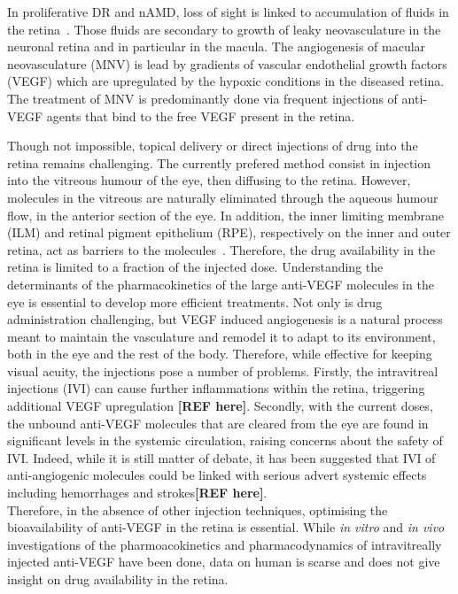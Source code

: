 \documentclass[12pt,a4paper]{article}
\begin{document}
In proliferative DR and nAMD, loss of sight is linked to accumulation of fluids in the retina~\cite{Waldstein_2016, Roberts_2020}.
Those fluids are secondary to growth of leaky neovasculature in the neuronal retina and in particular in the macula.
The angiogenesis of macular neovasculature (MNV) is lead by gradients of vascular endothelial growth factors (VEGF) which are upregulated by the hypoxic conditions in the diseased retina.
The treatment of MNV is predominantly done via frequent injections of anti-VEGF agents that bind to the free VEGF present in the retina.

Though not impossible, topical delivery or direct injections of drug into the retina remains challenging.
The currently prefered method consist in injection into the vitreous humour of the eye, then diffusing to the retina.
However, molecules in the vitreous are naturally eliminated through the aqueous humour flow, in the anterior section of the eye.
In addition, the inner limiting membrane (ILM) and retinal pigment epithelium (RPE), respectively on the inner and outer retina, act as barriers to the molecules~\cite{park_intraocular_2015}.
Therefore, the drug availability in the retina is limited to a fraction of the injected dose.
Understanding the determinants of the pharmacokinetics of the large anti-VEGF molecules in the eye is essential to develop more efficient treatments.
Not only is drug administration challenging, but VEGF induced angiogenesis is a natural process meant to maintain the vasculature and remodel it to adapt to its environment, both in the eye and the rest of the body.
Therefore, while effective for keeping visual acuity, the injections pose a number of problems.
Firstly, the intravitreal injections (IVI) can cause further inflammations within the retina, triggering additional VEGF upregulation \textbf{[REF here]}.
Secondly, with the current doses, the unbound anti-VEGF molecules that are cleared from the eye are found in significant levels in the systemic circulation, raising concerns about the safety of IVI.
Indeed, while it is still matter of debate, it has been suggested that IVI of anti-angiogenic molecules could be linked with serious advert systemic effects including hemorrhages and strokes\textbf{[REF here]}. \\
Therefore, in the absence of other injection techniques, optimising the bioavailability of anti-VEGF in the retina is essential.
While \textit{in vitro} and \textit{in vivo} investigations of the pharmoacokinetics and pharmacodynamics of intravitreally injected anti-VEGF have been done, data on human is scarse and does not give insight on drug availability in the retina.
\end{document}
